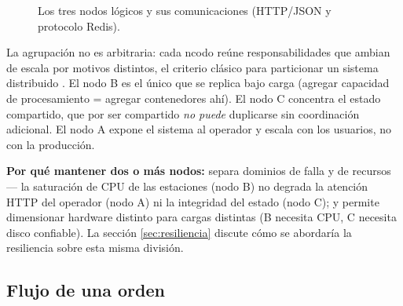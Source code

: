 \documentclass[12pt,a4paper]{article}
\begin{document}
\begin{figure}[H]
\centering
{}
\caption{Los tres nodos lógicos y sus comunicaciones (HTTP/JSON y protocolo Redis).}
\end{figure}

La agrupación no es arbitraria: cada ncodo reúne responsabilidades que
ambian de escala por motivos distintos, el criterio clásico para
particionar un sistema distribuido \cite{tanenbaum}. El nodo B es el único que se
replica bajo carga (agregar capacidad de procesamiento = agregar contenedores
ahí). El nodo C concentra el estado compartido, que por ser compartido
\emph{no puede} duplicarse sin coordinación adicional. El nodo A expone el
sistema al operador y escala con los usuarios, no con la producción.

\textbf{Por qué mantener dos o más nodos:} separa dominios de falla y de
recursos — la
saturación de CPU de las estaciones (nodo B) no degrada la atención HTTP del
operador (nodo A) ni la integridad del estado (nodo C); y permite dimensionar
hardware distinto para cargas distintas (B necesita CPU, C necesita disco
confiable). La sección \ref{sec:resiliencia} discute cómo se abordaría la
resiliencia sobre esta misma división.

\subsection{Flujo de una orden}
\end{document}
